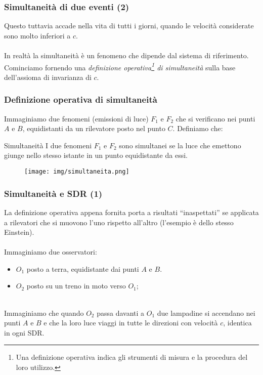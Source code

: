 \documentclass[]{beamer}
\theoremstyle{plain}
\begin{document}
\begin{frame}
\frametitle{Simultaneità di due eventi (2)}
Questo tuttavia accade nella vita di tutti i giorni, quando le velocità considerate sono molto inferiori a $ c $.\\~\pause\\

In realtà la simultaneità è un fenomeno che \alert<2>{dipende dal sistema di riferimento}. Cominciamo fornendo una \emph{definizione operativa\footnote{Una definizione operativa indica gli strumenti di misura e la procedura del loro utilizzo.} di simultaneità} sulla base dell'assioma di invarianza di $ c $.
\end{frame}

\begin{frame}
  \frametitle{Definizione operativa di simultaneità}
  Immaginiamo due fenomeni (emissioni di luce) $ F_1 $ e $ F_2 $ che si verificano nei punti $ A $ e $ B $, equidistanti da un rilevatore posto nel punto $ C $. Definiamo che:
  \begin{block}{Simultaneità}
  I due fenomeni $ F_1 $ e $ F_2 $ sono simultanei se la luce che emettono giunge nello stesso istante in un punto equidistante da essi.
  \end{block}  
\begin{figure}
\texttt{[image: img/simultaneita.png]}
\end{figure}
\end{frame}




\begin{frame}
  \frametitle{Simultaneità e SDR (1)}
La definizione operativa appena fornita porta a risultati ``inaspettati'' se applicata a rilevatori che si muovono l'uno rispetto all'altro (l'esempio è dello stesso Einstein).\\~\pause\\

Immaginiamo due osservatori:
\begin{itemize}
  \item $ O_1 $ posto a terra, equidistante dai punti $ A $ e $ B $.
  \item $ O_2 $ posto su un treno in moto verso $ O_1 $;
\end{itemize}~\pause\\
Immaginiamo che quando $ O_2 $ passa davanti a $ O_1 $ due lampadine si accendano nei punti $ A $ e $ B $ e che la loro luce viaggi in tutte le direzioni con velocità $ c $, identica in ogni SDR.
\end{frame}
\end{document}
